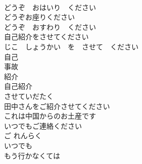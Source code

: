 \documentclass[8pt]{extreport}
\begin{document}
\begin{CJK}{UTF8}{min}
\\	どうぞ　おはいり　ください
\\	どうぞお座りください	
\\	どうぞ　おすわり　ください	
\\	自己紹介をさせてください	
\\	じこ　しょうかい　を　させて　ください
\\	自己 
\\	事故 
\\	紹介 
\\	自己紹介 
\\	させていだたく 
\\	田中さんをご紹介させてください	
\\	これは中国からのお土産です	
\\	いつでもご連絡ください	
\\	ご れんらく 
\\	いつでも 
\\	もう行かなくては	
\end{CJK}
\end{document}
